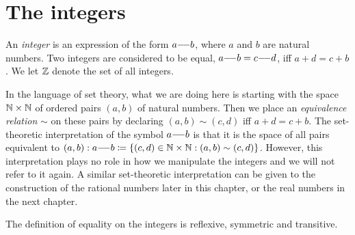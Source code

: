 \section{The integers}\label{sec:4.1}

\begin{defn}[Integers]\label{4.1.1}
  An \emph{integer} is an expression of the form \(a {-}\!{-} b\), where \(a\) and \(b\) are natural numbers.
  Two integers are considered to be equal, \(a {-}\!{-} b = c {-}\!{-} d\), iff \(a + d = c + b\).
  We let \(\mathbb{Z}\) denote the set of all integers.
\end{defn}

\begin{note}
  In the language of set theory, what we are doing here is starting with the space \(\mathbb{N} \times \mathbb{N}\) of ordered pairs \((a, b)\) of natural numbers.
  Then we place an \emph{equivalence relation} \(\sim\) on these pairs by declaring \((a, b) \sim (c, d)\) iff \(a + d = c + b\).
  The set-theoretic interpretation of the symbol \(a {-}\!{-} b\) is that it is the space of all pairs equivalent to \((a, b): a {-}\!{-} b \coloneqq \left\lbrace(c, d) \in \mathbb{N} \times \mathbb{N} : (a, b) \sim (c, d)\right\rbrace\).
  However, this interpretation plays no role in how we manipulate the integers and we will not refer to it again.
  A similar set-theoretic interpretation can be given to the construction of the rational numbers later in this chapter, or the real numbers in the next chapter.
\end{note}

\begin{ac}\label{ac:4.1.1}
  The definition of equality on the integers is reflexive, symmetric and transitive.
\end{ac}


